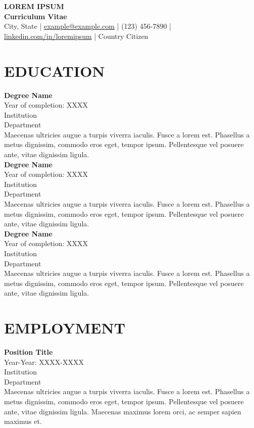 \documentclass[a4paper,9pt]{extarticle}
\begin{document}
\pagestyle{empty}

\begin{center}
\textbf{\Large LOREM IPSUM }\\[3pt] %
\textbf{Curriculum Vitae}\\[1pt] %
City, State | \href{mailto:example@example.com}{example@example.com} | (123) 456-7890 | \href{https://www.linkedin.com/in/loremipsum}{linkedin.com/in/loremipsum} | Country Citizen %
\end{center}


\section*{EDUCATION}

\noindent
\newline
\textbf{Degree Name} \\
Year of completion: XXXX \\ 
Institution \\ 
Department \\
Maecenas ultricies augue a turpis viverra iaculis. Fusce a lorem est. Phasellus a metus dignissim, commodo eros eget, tempor ipsum. Pellentesque vel posuere ante, vitae dignissim ligula. \\

\noindent
\textbf{Degree Name} \\
Year of completion: XXXX \\ 
Institution \\ 
Department \\
Maecenas ultricies augue a turpis viverra iaculis. Fusce a lorem est. Phasellus a metus dignissim, commodo eros eget, tempor ipsum. Pellentesque vel posuere ante, vitae dignissim ligula. \\

\noindent
\textbf{Degree Name} \\
Year of completion: XXXX \\ 
Institution \\ 
Department  \\
Maecenas ultricies augue a turpis viverra iaculis. Fusce a lorem est. Phasellus a metus dignissim, commodo eros eget, tempor ipsum. Pellentesque vel posuere ante, vitae dignissim ligula. 


\section*{EMPLOYMENT}
\noindent
\newline
\textbf{Position Title} \\
Year-Year: XXXX-XXXX \\
Institution \\ 
Department \\
Maecenas ultricies augue a turpis viverra iaculis. Fusce a lorem est. Phasellus a metus dignissim, commodo eros eget, tempor ipsum. Pellentesque vel posuere ante, vitae dignissim ligula. Maecenas maximus lorem orci, ac semper sapien maximus et. \\ 
\end{document}
